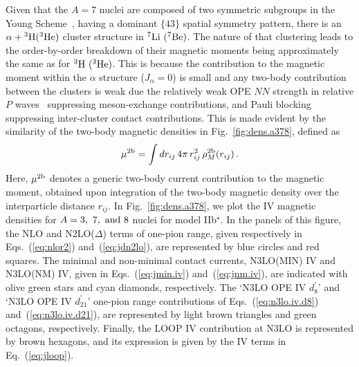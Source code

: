 \documentclass[aps,prc,floatfix,showpacs,twocolumn, preprintnumbers]{revtex4-2}
\newcommand{\beq}{\begin{equation}}
\newcommand{\eeq}{\end{equation}}
\def\beq{\begin{equation}}
\def\eeq{\end{equation}}
\begin{document}
Given that the $A=7$ nuclei are composed of two symmetric subgroups in the Young Scheme~\cite{Wiringa:2006ih}, having a dominant $\{43\}$ spatial symmetry pattern, there is an $\alpha + {}^3{\rm H}(^3{\rm He})$ cluster structure in $^7{\rm Li}~(^7{\rm Be})$. The nature of that clustering leads to the order-by-order breakdown of their magnetic moments being approximately the same as for $^3\rm H~(^3{\rm He})$. This is because the contribution to the magnetic moment within the $\alpha$ structure ($J_\alpha=0$) is small and any two-body contribution between the clusters is weak due the relatively weak OPE $N\!N$ strength in relative $P$ waves~\cite{Wiringa:2006ih} suppressing meson-exchange contributions, and Pauli blocking suppressing inter-cluster contact contributions. This is made evident by the similarity of the two-body magnetic densities in Fig.~\ref{fig:dens.a378}, defined as
\beq
\mu^{\rm 2b} = \int dr_{ij} \, 4\pi\, r_{ij}^2\, \rho_M^{\rm 2b}(r_{ij})\, .
\eeq
Here, $\mu^{\rm 2b}$ denotes a generic two-body current contribution to the magnetic moment, obtained upon integration of the two-body magnetic density over the interparticle distance $r_{ij}$. In Fig.~\ref{fig:dens.a378}, we plot the IV magnetic densities for $A=3,~7,~{\rm and}~8$ nuclei for model IIb$^{\star}$. In the panels of this figure, the NLO and N2LO($\Delta$) terms of one-pion range, given respectively in Eqs.~(\ref{eq:nlor2}) and~(\ref{eq:jdn2lo}), are represented by blue circles and red squares. The minimal and non-minimal contact currents, N3LO(MIN) IV and N3LO(NM) IV, given in Eqs.~(\ref{eq:jmin.iv}) and~(\ref{eq:jnm.iv}), are indicated with olive green stars and cyan diamonds, respectively. The `N3LO OPE IV $d_8^\prime$' and `N3LO OPE IV $d_{21}^\prime$' one-pion range contributions of Eqs.~(\ref{eq:n3lo.iv.d8}) and~(\ref{eq:n3lo.iv.d21}), are represented by light brown triangles and green octagons, respectively.  Finally, the  LOOP IV contribution at N3LO is represented by brown hexagons, and its expression is given by the IV terms in Eq.~(\ref{eq:jloop}).
\end{document}
